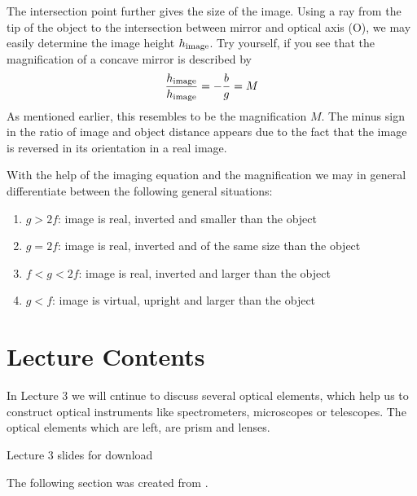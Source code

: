 \documentclass[letterpaper,10pt,english]{sphinxmanual}
\let\sphinxpxdimen\pdfpxdimen\else\newdimen\sphinxpxdimen
\begin{document}
The intersection point further gives the size of the image. Using a ray from the tip of the object to the intersection between mirror and optical axis (O), we may easily determine the image height \(h_{\rm image}\). Try yourself, if you see that the magnification of a concave mirror is described by
\begin{equation*}
\begin{split}\frac{h_{\rm image}}{h_{\rm image}}=-\frac{b}{g}=M\end{split}
\end{equation*}
As mentioned earlier, this resembles to be the magnification \(M\). The minus sign in the ratio of image and object distance appears due to the fact that the image is reversed in its orientation in a real image.

With the help of the imaging equation and the magnification we may in general differentiate between the following general situations:
\begin{enumerate}
%
\item {} 
\(g>2f\): image is real, inverted and smaller than the object

\item {} 
\(g=2f\): image is real, inverted and of the same size than the object

\item {} 
\(f<g<2f\): image is real, inverted and larger than the object

\item {} 
\(g<f\): image is virtual, upright and larger than the object

\end{enumerate}


\section{Lecture Contents}
\label{\detokenize{lectures/L3/overview_3:lecture-contents}}\label{\detokenize{lectures/L3/overview_3::doc}}
In Lecture 3 we will cntinue to discuss several optical elements, which help us to construct optical instruments like spectrometers, microscopes or telescopes. The optical elements which are left, are prism and lenses.

\noindent\sphinxincludegraphics[width=600\sphinxpxdimen]{{slides6}.png}

Lecture 3 slides for download 

The following section was created from .
\end{document}

